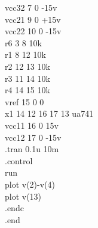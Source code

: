 \documentclass[12pt]{article}
\begin{document}
vcc32 7 0 -15v\\
vcc21 9 0 +15v\\
vcc22 10 0 -15v\\
r6 3 8 10k\\
r1 8 12 10k\\
r2 12 13 10k\\
r3 11 14 10k\\
r4 14 15 10k\\
vref 15 0 0\\
x1 14 12 16 17 13 ua741\\
vcc11 16 0 15v\\
vcc12 17 0 -15v\\
.tran 0.1u 10m \\
.control\\
run\\
plot  v(2)-v(4)\\
plot  v(13)\\
.endc\\
.end \\
\newpage
\end{document}
